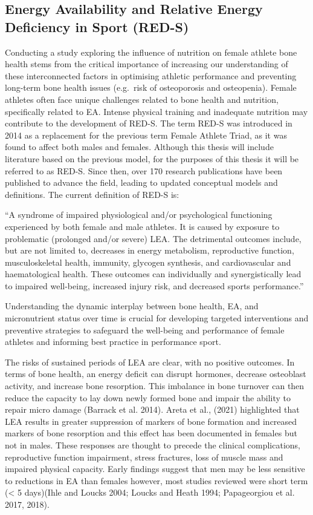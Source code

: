\documentclass[
]{article}
\begin{document}
\subsection{Energy Availability and Relative Energy Deficiency in Sport (RED-S)}\label{energy-availability-and-relative-energy-deficiency-in-sport-red-s}

Conducting a study exploring the influence of nutrition on female athlete bone health stems from the critical importance of increasing our understanding of these interconnected factors in optimising athletic performance and preventing long-term bone health issues (e.g.~risk of osteoporosis and osteopenia). Female athletes often face unique challenges related to bone health and nutrition, specifically related to EA. Intense physical training and inadequate nutrition may contribute to the development of RED-S. The term RED-S was introduced in 2014 as a replacement for the previous term Female Athlete Triad, as it was found to affect both males and females. Although this thesis will include literature based on the previous model, for the purposes of this thesis it will be referred to as RED-S. Since then, over 170 research publications have been published to advance the field, leading to updated conceptual models and definitions. The current definition of RED-S is:

``A syndrome of impaired physiological and/or psychological functioning experienced by both female and male athletes. It is caused by exposure to problematic (prolonged and/or severe) LEA. The detrimental outcomes include, but are not limited to, decreases in energy metabolism, reproductive function, musculoskeletal health, immunity, glycogen synthesis, and cardiovascular and haematological health. These outcomes can individually and synergistically lead to impaired well-being, increased injury risk, and decreased sports performance.''

Understanding the dynamic interplay between bone health, EA, and micronutrient status over time is crucial for developing targeted interventions and preventive strategies to safeguard the well-being and performance of female athletes and informing best practice in performance sport.

The risks of sustained periods of LEA are clear, with no positive outcomes. In terms of bone health, an energy deficit can disrupt hormones, decrease osteoblast activity, and increase bone resorption. This imbalance in bone turnover can then reduce the capacity to lay down newly formed bone and impair the ability to repair micro damage (Barrack et al. 2014). Areta et al., (2021) highlighted that LEA results in greater suppression of markers of bone formation and increased markers of bone resorption and this effect has been documented in females but not in males. These responses are thought to precede the clinical complications, reproductive function impairment, stress fractures, loss of muscle mass and impaired physical capacity. Early findings suggest that men may be less sensitive to reductions in EA than females however, most studies reviewed were short term (\textless{} 5 days)(Ihle and Loucks 2004; Loucks and Heath 1994; Papageorgiou et al. 2017, 2018).
\end{document}
